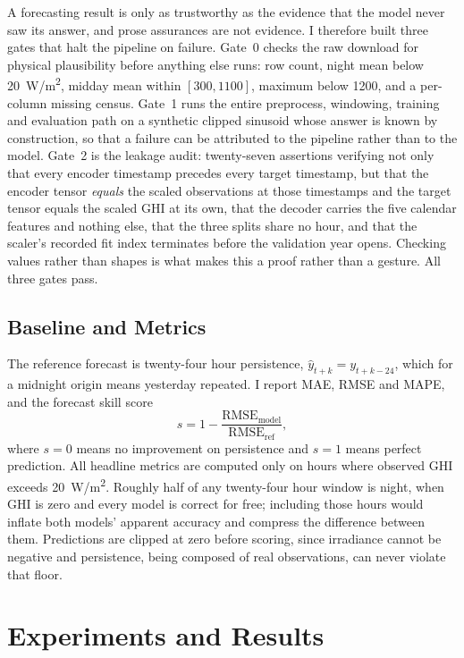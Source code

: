\documentclass{article}
\begin{document}
A forecasting result is only as trustworthy as the evidence that the model never
saw its answer, and prose assurances are not evidence. I therefore built three
gates that halt the pipeline on failure. Gate~0 checks the raw download for
physical plausibility before anything else runs: row count, night mean below
20~W/m\textsuperscript{2}, midday mean within $[300, 1100]$, maximum below 1200,
and a per-column missing census. Gate~1 runs the entire preprocess, windowing,
training and evaluation path on a synthetic clipped sinusoid whose answer is
known by construction, so that a failure can be attributed to the pipeline rather
than to the model. Gate~2 is the leakage audit: twenty-seven assertions verifying
not only that every encoder timestamp precedes every target timestamp, but that
the encoder tensor \emph{equals} the scaled observations at those timestamps and
the target tensor equals the scaled GHI at its own, that the decoder carries the
five calendar features and nothing else, that the three splits share no hour, and
that the scaler's recorded fit index terminates before the validation year opens.
Checking values rather than shapes is what makes this a proof rather than a
gesture. All three gates pass.

\subsection{Baseline and Metrics}

The reference forecast is twenty-four hour persistence,
$\hat{y}_{t+k} = y_{t+k-24}$, which for a midnight origin means yesterday
repeated. I report MAE, RMSE and MAPE, and the forecast skill score
\cite{marquez2013proposed}
\begin{equation}
    s = 1 - \frac{\mathrm{RMSE}_{\text{model}}}{\mathrm{RMSE}_{\text{ref}}},
\end{equation}
where $s = 0$ means no improvement on persistence and $s = 1$ means perfect
prediction. All headline metrics are computed only on hours where observed GHI
exceeds 20~W/m\textsuperscript{2}. Roughly half of any twenty-four hour window is
night, when GHI is zero and every model is correct for free; including those
hours would inflate both models' apparent accuracy and compress the difference
between them. Predictions are clipped at zero before scoring, since irradiance
cannot be negative and persistence, being composed of real observations, can
never violate that floor.

\section{Experiments and Results}
\end{document}

